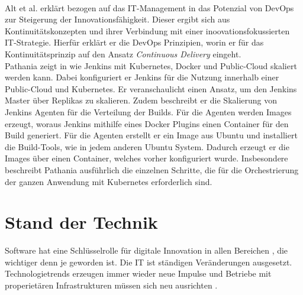 \medskip
\\
Alt et al. erklärt bezogen auf das IT-Management in \cite{Alt2017} das Potenzial von DevOps zur Steigerung der Innovationsfähigkeit. Dieser ergibt sich aus Kontinuitätskonzepten und ihrer Verbindung mit einer inoovationsfokussierten IT-Strategie. Hierfür erklärt er die DevOps Prinzipien, worin er für das Kontinuitätsprinzip auf den Ansatz \emph{Continuous Delivery} eingeht. 
\medskip
\\
Pathania zeigt in \cite{Pathania2017} wie Jenkins mit Kubernetes, Docker und Public-Cloud skaliert werden kann. Dabei konfiguriert er Jenkins für die Nutzung innerhalb einer Public-Cloud und Kubernetes. Er veranschaulicht einen Ansatz, um den Jenkins Master über Replikas zu skalieren. Zudem beschreibt er die Skalierung von Jenkins Agenten für die Verteilung der Builds. Für die Agenten werden Images erzeugt, woraus Jenkins mithilfe eines Docker Plugins einen Container für den Build generiert. Für die Agenten erstellt er ein Image aus Ubuntu und installiert die Build-Tools, wie in jedem anderen Ubuntu System.
Dadurch erzeugt er die Images über einen Container, welches vorher konfiguriert wurde. Insbesondere beschreibt Pathania ausführlich die einzelnen Schritte, die für die Orchestrierung der ganzen Anwendung mit Kubernetes erforderlich sind.

\section{Stand der Technik}
Software hat eine Schlüsselrolle für digitale Innovation in allen Bereichen \cite{Alt2017}, die wichtiger denn je geworden ist. Die IT ist ständigen Veränderungen ausgesetzt. Technologietrends erzeugen immer wieder neue Impulse und Betriebe mit properietären Infrastrukturen müssen sich neu ausrichten \cite{Bussmann2006}.

